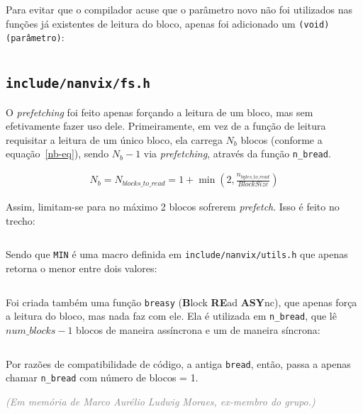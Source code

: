 \documentclass{article}
\begin{document}
Para evitar que o compilador acuse que o parâmetro novo não foi utilizados nas
funções já existentes de leitura do bloco, apenas foi adicionado um
\texttt{(void) (parâmetro)}:

\inputminted[firstline=133, lastline=135]{c}{../../src/kernel/dev/ramdisk/ramdisk.c}

\subsection{\texttt{include/nanvix/fs.h}}

O \textit{prefetching} foi feito apenas forçando a leitura de um bloco, mas sem
efetivamente fazer uso dele. Primeiramente, em vez de a função de leitura
requisitar a leitura de um único bloco, ela carrega $N_b$ blocos (conforme a
equação~\ref{nb-eq}), sendo $N_b - 1$ via \textit{prefetching}, através da
função \texttt{n\_bread}.

{\Large
\begin{align}
    N_b = N_{blocks\_to\_read} = 1 + \min(2, \frac{n_{bytes\_to\_read}}{BlockSize})
    \label{nb-eq}
\end{align}
}

Assim, limitam-se para no máximo 2 blocos sofrerem \textit{prefetch}. Isso é
feito no trecho:

\inputminted[firstline=305, lastline=305]{c}{../../src/kernel/fs/file.c}

Sendo que \texttt{MIN} é uma macro definida em \texttt{include/nanvix/utils.h}
que apenas retorna o menor entre dois valores:

\inputminted{c}{../../include/nanvix/utils.h}

Foi criada também uma função \texttt{breasy} (\textbf{B}lock \textbf{RE}ad
\textbf{ASY}nc), que apenas força a leitura do bloco, mas nada faz com ele. Ela
é utilizada em \texttt{n\_bread}, que lê \texttt{$num\_blocks - 1$} blocos de
maneira assíncrona e um de maneira síncrona:

\inputminted[firstline=574, lastline=577]{c}{../../src/kernel/fs/buffer.c}

Por razões de compatibilidade de código, a antiga \texttt{bread}, então, passa
a apenas chamar \texttt{n\_bread} com número de blocos = 1.

\vspace*{\fill}
\textcolor{gray}{
    \textit{\tiny (Em memória de Marco Aurélio Ludwig Moraes, ex-membro do
    grupo.)}}
\end{document}
